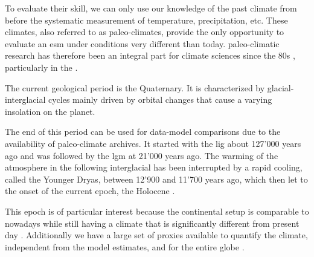 \begin{refsection}
To evaluate their skill, we can only use our knowledge of the past climate from before the systematic measurement of temperature, precipitation, etc. These climates, also referred to as paleo-climates, provide the only opportunity to evaluate an \gls{esm} under conditions very different than today. paleo-climatic research has therefore been an integral part for climate sciences since the 80s \citep{COHMAPMembers1988, JoussaumeTaylor1995}, particularly in the  \citep{BraconnotOttoBliesnerHarrisonEtAl2007, BraconnotOttoBliesnerHarrisonEtAl2007a, BraconnotHarrisonKageyamaEtAl2012, KageyamaBraconnotHarrisonEtAl2016, Otto-BliesnerBraconnotHarrisonEtAl2017, JungclausBardBaroniEtAl2017}. 

The current geological period is the Quaternary. It is characterized by glacial-interglacial cycles mainly driven by orbital changes \citep{HaysImbrieShackleton1976, ImbrieBergerBoyleEtAl1993} that cause a varying insolation on the planet. 

The end of this period can be used for data-model comparisons due to the availability of paleo-climate archives. It started with the \gls{lig} about 127'000 years ago and was followed by the \gls{lgm} at 21'000 years ago. The warming of the atmosphere in the following interglacial  has been interrupted by a rapid cooling, called the Younger Dryas, between 12'900 and 11'700 years ago, which then let to the onset of the current epoch, the Holocene \citep{WalkerJohnsenRasmussenEtAl2009} .


This epoch is of particular interest because the continental setup is comparable to nowadays while still having a climate that is significantly different from present day . Additionally we have a large set of proxies available to quantify the climate, independent from the model estimates, and for the entire globe \citep{WannerBeerButikoferEtAl2008} . 



\end{refsection}

